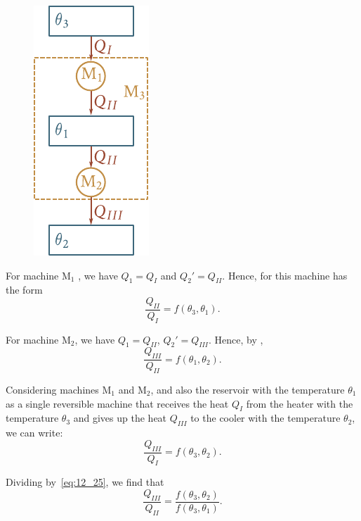 \begin{figure}[t]
	\begin{center}
		\includegraphics[scale=1.0]{figures/ch_12/fig_12_5.pdf}
		\caption[]{}
		\label{fig:12_5}
	\end{center}
	\vspace{-0.8cm}
\end{figure}

For machine M$_1$ , we have $Q_1=Q_I$ and $Q_2'=Q_{II}$. Hence,  for this machine has the form
\begin{equation}\label{eq:12_25}
	\frac{Q_{II}}{Q_I} = f(\theta_3,\theta_1).
\end{equation}

\noindent
For machine M$_2$, we have $Q_1=Q_{II}$, $Q_2'=Q_{III}$. Hence, by ,
\begin{equation}\label{eq:12_26}
	\frac{Q_{III}}{Q_{II}} = f(\theta_1,\theta_2).
\end{equation}

\noindent
Considering machines M$_1$ and M$_2$, and also the reservoir with the temperature $\theta_1$ as a single reversible machine that receives the heat $Q_I$ from the heater with the temperature $\theta_3$ and gives up the heat $Q_{III}$ to the cooler with the temperature $\theta_2$, we can write:
\begin{equation}\label{eq:12_27}
	\frac{Q_{III}}{Q_{I}} = f(\theta_3,\theta_2).
\end{equation}

Dividing  by~\eqref{eq:12_25}, we find that
\begin{equation*}
	\frac{Q_{III}}{Q_{II}} = \frac{f(\theta_3,\theta_2)}{f(\theta_3,\theta_1)}.
\end{equation*}


